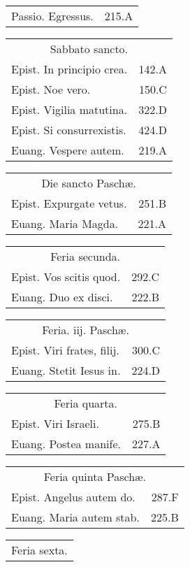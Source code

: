\documentclass[a5paper,10pt]{book}
\def\ae{æ}
\begin{document}
\begin{multicols}{2}
\begin{tabular}{l r}
Passio. Egressus. & 215.A\\
\end{tabular}
\begin{tabular}{l r}
\multicolumn{2}{c}{\color{red} Sabbato sancto.}\\
Epist. In principio crea. & 142.A\\
Epist. Noe vero. & 150.C\\
\color{red} Epist. Vigilia matutina. & 322.D\\
Epist. Si consurrexistis. & 424.D\\
Euang. Vespere autem. & 219.A\\
\end{tabular}
\begin{tabular}{l r}
\multicolumn{2}{c}{\color{red} Die sancto Pasch\ae .}\\
Epist. Expurgate vetus. & 251.B\\
Euang. Maria Magda. & 221.A\\
\end{tabular}
\begin{tabular}{l r}
\multicolumn{2}{c}{\color{red} Feria secunda.}\\
Epist. Vos scitis quod. & 292.C\\
Euang. Duo ex disci. & 222.B\\
\end{tabular}
\begin{tabular}{l r}
\multicolumn{2}{c}{\color{red} Feria. iij. Pasch\ae .}\\
Epist. Viri frates, filij. & 300.C\\
Euang. Stetit Iesus in. & 224.D\\
\end{tabular}
\begin{tabular}{l r}
\multicolumn{2}{c}{\color{red} Feria quarta.}\\
Epist. Viri Israeli. & 275.B\\
Euang. Postea manife. & 227.A\\
\end{tabular}
\begin{tabular}{l r}
\multicolumn{2}{c}{\color{red} Feria quinta Pasch\ae .}\\
Epist. Angelus autem do. & 287.F\\
Euang. Maria autem stab. & 225.B\\
\end{tabular}
\begin{tabular}{l r}
\multicolumn{2}{c}{\color{red} Feria sexta.}\\

\end{tabular}
\end{multicols}
\end{document}
